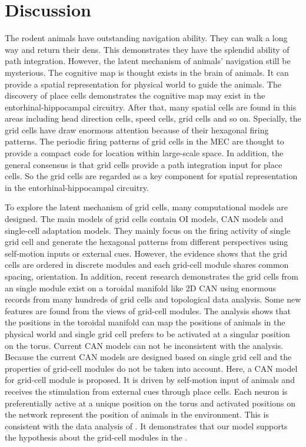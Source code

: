 \documentclass[final,5p,times,twocolumn,authoryear]{elsarticle}
\begin{document}
\section{Discussion}
The rodent animals have outstanding navigation ability\citep{Ball2013}. They can walk a long way and return their dens. This demonstrates they have the splendid ability of path integration. However, the latent mechanism of animals' navigation still be mysterious. The cognitive map is thought exists in the brain of animals\citep{Tolman1948}. It can provide a spatial representation for physical world to guide the animals. The discovery of place cells demonstrates the cognitive map may exist in the entorhinal-hippocampal circuitry\citep{OKeefe1978}. After that, many spatial cells are found in this areas including head direction cells, speed cells, grid cells and so on. Specially, the grid cells have draw enormous attention because of their hexagonal firing patterns. The periodic firing patterns of grid cells in the MEC are thought to provide a compact code for location within large-scale space\citep{Bush2015}. In addition, the general consensus is that grid cells provide a path integration input for place cells\citep{McNaughton2006}. So the grid cells are regarded as a key component for spatial representation in the entorhinal-hippocampal circuitry.

To explore the latent mechanism of grid cells, many computational models are designed. The main models of grid cells contain OI models\citep{OKeefe2005,Burgess2007,Hasselmo2007,Pastoll2013,Burgess2008}, CAN models\citep{Fuhs2006,Burak2009,Guanella2007,Shipston-Sharman2016,Couey2013} and single-cell adaptation models\citep{Kropff2008,Si2012}. They mainly focus on the firing activity of single grid cell and generate the hexagonal patterns from different perspectives using self-motion inputs or external cues. However, the evidence shows that the grid cells are ordered in discrete modules and each grid-cell module shares common spacing, orientation\citep{Stensola2012,Rowland2016}. In addition, recent research demonstrates the grid cells from an single module exist on a toroidal manifold like 2D CAN using enormous records from many hundreds of grid cells and topological data analysis\citep{Gardner2022}. Some new features are found from the views of grid-cell modules. The analysis shows that the positions in the toroidal manifold can map the positions of animals in the physical world and single grid cell prefers to be activated at a singular position on the torus\citep{Gardner2022}. Current CAN models\citep{Fuhs2006,Burak2009,Guanella2007} can not be inconsistent with the analysis. Because the current CAN models are designed based on single grid cell and the properties of grid-cell modules do not be taken into account. Here, a CAN model for grid-cell module is proposed. It is driven by self-motion input of animals and receives the stimulation from external cues through place cells. Each neuron is preferentially active at a unique position on the torus and activated positions on the network represent the position of animals in the environment. This is consistent with the data analysis of \citet{Gardner2022}.  It demonstrates that our model supports the hypothesis about the grid-cell modules in the \citet{Gardner2022}.
\end{document}
